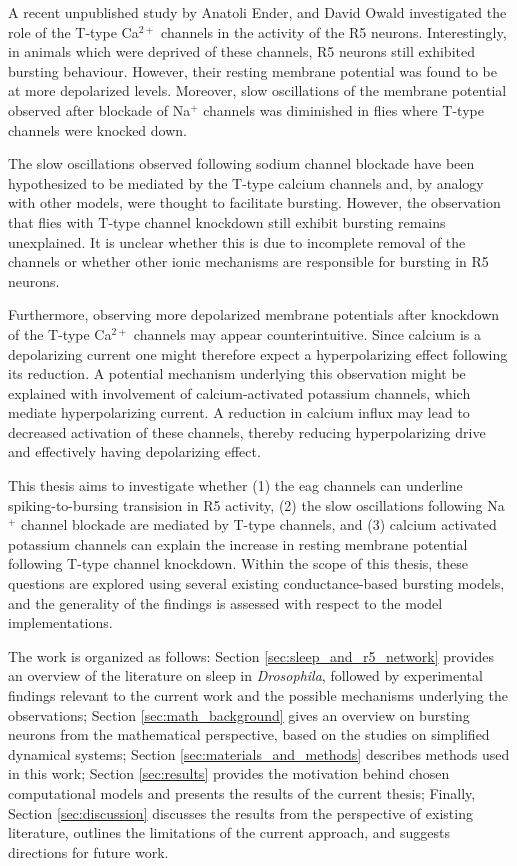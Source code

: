 \documentclass[../main.tex]{subfiles}
\begin{document}
A recent unpublished study by Anatoli Ender, and David Owald investigated the role of the T-type Ca$^{2+}$ channels in the activity of the R5 neurons. Interestingly, in animals which were deprived of these channels, R5 neurons still exhibited bursting behaviour. However, their resting membrane potential was found to be at more depolarized levels. Moreover, slow oscillations of the membrane potential observed after blockade of Na$^{+}$ channels was diminished in flies where T-type channels were knocked down.

The slow oscillations observed following sodium channel blockade have been hypothesized to be mediated by the T-type calcium channels and, by analogy with other models, were thought to facilitate bursting. However, the observation that flies with T-type channel knockdown still exhibit bursting remains unexplained. It is unclear whether this is due to incomplete removal of the channels or whether other ionic mechanisms are responsible for bursting in R5 neurons.

Furthermore, observing more depolarized membrane potentials after knockdown of the T-type Ca$^{2+}$ channels may appear counterintuitive. Since calcium is a depolarizing current  one might therefore expect a hyperpolarizing effect following its reduction. A potential mechanism underlying this observation might be explained with involvement of calcium-activated potassium channels, which mediate hyperpolarizing current. A reduction in calcium influx may lead to decreased activation of these channels, thereby reducing hyperpolarizing drive and effectively having depolarizing effect.

This thesis aims to investigate whether (1) the \gls{eag} channels can underline spiking-to-bursing transision in R5 activity, (2) the slow oscillations following Na$^+$ channel blockade are mediated by T-type channels, and (3) calcium activated potassium channels can explain the increase in resting membrane potential following T-type channel knockdown. Within the scope of this thesis, these questions are explored using several existing conductance-based bursting models, and the generality of the findings is assessed with respect to the model implementations.

The work is organized as follows: Section \ref{sec:sleep_and_r5_network} provides an overview of the literature on sleep in \textit{Drosophila}, followed by experimental findings relevant to the current work and the possible mechanisms underlying the observations; Section \ref{sec:math_background} gives an overview on bursting neurons from the mathematical perspective, based on the studies on simplified dynamical systems; Section \ref{sec:materials_and_methods} describes methods used in this work; Section \ref{sec:results} provides the motivation behind chosen computational models and presents the results of the current thesis; Finally, Section \ref{sec:discussion} discusses the results from the perspective of existing literature, outlines the limitations of the current approach, and suggests directions for future work.
\end{document}

